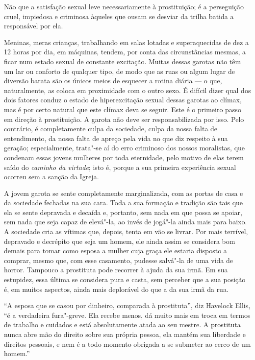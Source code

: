 Não que a satisfação sexual leve necessariamente à prostituição; é a
perseguição cruel, impiedosa e criminosa àqueles que ousam se desviar da
trilha batida a responsável por ela.

Meninas, meras crianças, trabalhando em salas lotadas e superaquecidas
de dez a 12 horas por dia, em máquinas, tendem, por conta das
circunstâncias mesmas, a ficar num estado sexual de constante excitação.
Muitas dessas garotas não têm um lar ou conforto de qualquer tipo, de
modo que as ruas ou algum lugar de diversão barata são os únicos meios
de esquecer a rotina diária --- o que, naturalmente, as coloca em
proximidade com o outro sexo. É difícil dizer qual dos dois fatores
conduz o estado de hiperexcitação sexual dessas garotas ao clímax, mas é
por certo natural que este clímax deva se seguir. Este é o primeiro
passo em direção à prostituição. A garota não deve ser responsabilizada
por isso. Pelo contrário, é completamente culpa da sociedade, culpa da
nossa falta de entendimento, da nossa falta de apreço pela vida no que
diz respeito à sua geração; especialmente, trata"-se aí do erro
criminoso dos nossos moralistas, que condenam essas jovens mulheres por
toda eternidade, pelo motivo de elas terem saído do \textit{caminho da
virtude}; isto é, porque a sua primeira experiência sexual ocorreu sem
a sanção da Igreja.

A jovem garota se sente completamente marginalizada, com as portas de
casa e da sociedade fechadas na sua cara. Toda a sua formação e tradição
são tais que ela se sente depravada e decaída e,
portanto, sem nada em que possa se apoiar, sem nada que seja capaz de
elevá"-la, ao invés de jogá"-la ainda mais para baixo. A sociedade cria as
vítimas que, depois, tenta em vão se livrar. Por mais terrível,
depravado e decrépito que seja um homem, ele ainda assim se considera
bom demais para tomar como esposa a mulher cuja graça ele estaria
disposto a comprar, mesmo que, com esse casamento, pudesse salvá"-la de
uma vida de horror. Tampouco a prostituta pode recorrer à ajuda da sua
irmã. Em sua estupidez, essa última se considera pura e casta, sem
perceber que a sua posição é, em muitos aspectos, ainda mais
deplorável do que a da sua irmã da rua.

``A esposa que se casou por dinheiro, comparada à prostituta'',
diz Havelock Ellis, ``é a verdadeira fura"-greve. Ela recebe menos, dá muito
mais em troca em termos de trabalho e cuidados e está absolutamente
atada ao seu mestre. A prostituta nunca abre mão do direito sobre sua
própria pessoa, ela mantém sua liberdade e direitos pessoais, e nem é a
todo momento obrigada a se submeter ao cerco de um homem.''

